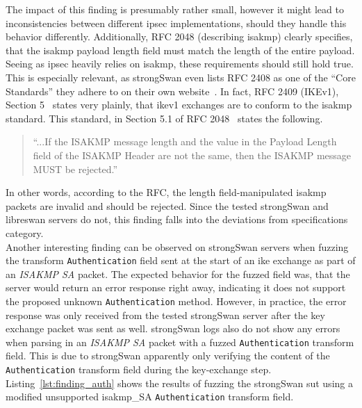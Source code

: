\newpage
The impact of this finding is presumably rather small, however it might lead to inconsistencies between different \ac{ipsec} implementations, should they handle this behavior differently. Additionally, RFC 2048 (describing \ac{isakmp}) clearly specifies, that the \ac{isakmp} payload length field must match the length of the entire payload. Seeing as \ac{ipsec} heavily relies on \ac{isakmp}, these requirements should still hold true. This is especially relevant, as strongSwan even lists RFC 2408 as one of the ``Core Standards'' they adhere to on their own website~\cite{strongswan-ietf}. In fact, RFC 2409 (IKEv1), Section 5~\cite{rfc:ikev1} states very plainly, that \ac{ike}v1 exchanges are to conform to the \ac{isakmp} standard.
This standard, in Section 5.1 of RFC 2048~\cite{rfc:isakmp} states the following. 

\begin{quotation}
	``...If the ISAKMP message length and the value in
	the Payload Length field of the ISAKMP Header are not the same, then
	the ISAKMP message MUST be rejected.''
\end{quotation}

In other words, according to the RFC, the length field-manipulated \ac{isakmp} packets are invalid and should be rejected. Since the tested strongSwan and libreswan servers do not, this finding falls into the deviations from specifications category.  \\

Another interesting finding can be observed on strongSwan servers when fuzzing the transform \texttt{Authentication} field sent at the start of an \ac{ike} exchange as part of an \emph{ISAKMP SA} packet. The expected behavior for the fuzzed field was, that the server would return an error response right away, indicating it does not support the proposed unknown \texttt{Authentication} method. However, in practice, the error response was only received from the tested strongSwan server after the key exchange packet was sent as well. strongSwan logs also do not show any errors when parsing in an \emph{ISAKMP SA} packet with a fuzzed \texttt{Authentication} transform field. This is due to strongSwan apparently only verifying the content of the \texttt{Authentication} transform field during the key-exchange step. Listing~\ref{lst:finding_auth} shows the results of fuzzing the strongSwan \ac{sut} using a modified unsupported \ac{isakmp}\_SA \texttt{Authentication} transform field. \\
\vspace{3mm}

